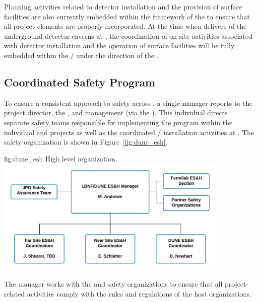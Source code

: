 Planning activities related to detector installation and the provision 
of surface facilities are also currently embedded within the framework 
of the  to ensure that all project elements are properly 
incorporated.  At the time when   delivers 
 of the underground detector caverns at , the 
coordination of on-site activities associated with detector installation 
and the operation of surface facilities will be fully embedded within 
the /  under the direction of the .  


\subsection{Coordinated Safety Program}    
\label{sec:dune_safety}


To ensure a consistent approach to safety across ,
a single   manager reports 
to the  project director, the , and 
management (via the  ).  This individual
directs separate safety teams responsible for implementing the
  program within %
the individual  
and  projects as well as the coordinated /
installation activities at . The safety organization 
is shown in Figure~\ref{fig:dune_esh}.

\begin{dunefigure}{fig:dune_esh}
  {High level   organization.}
  \includegraphics[width=0.85\textwidth]{graphics/DUNE_Safety_Org_Chart_v2}
\end{dunefigure}
The   manager works with the  
and  safety organizations to ensure that all project-related 
activities comply with the rules and regulations of the host 
organizations.  

